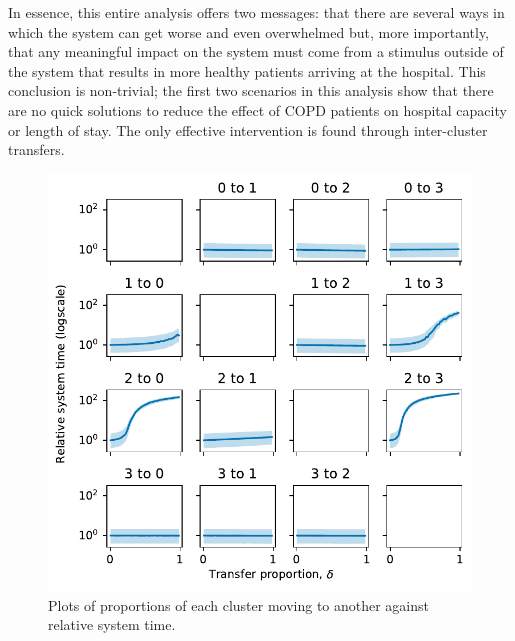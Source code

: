\documentclass[11pt]{article}
\newlength{\imgwidth}
\begin{document}
In essence, this entire analysis offers two messages: that there are several
ways in which the system can get worse and even overwhelmed but, more
importantly, that any meaningful impact on the system must come from a stimulus
outside of the system that results in more healthy patients arriving at the
hospital. This conclusion is non-trivial; the first two scenarios in this
analysis show that there are no quick solutions to reduce the effect of COPD
patients on hospital capacity or length of stay. The only effective intervention
is found through inter-cluster transfers.

\begin{figure}
    \centering
    \includegraphics[width=\imgwidth]{img_moving_time}
    \caption{%
        Plots of proportions of each cluster moving to another against relative
        system time.
    }\label{fig:moving_time}
\end{figure}
\end{document}
